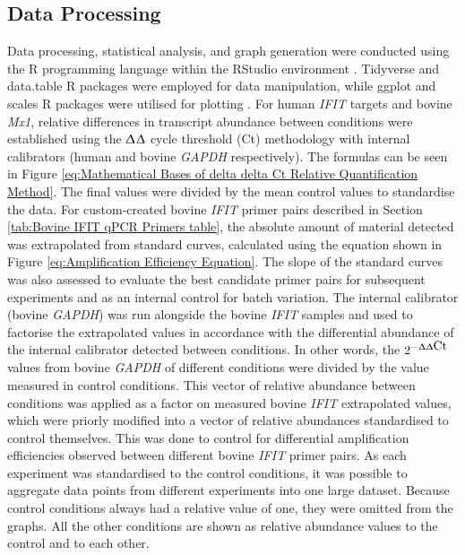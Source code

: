 \subsection{Data Processing} \label{subsec:Data Processing}
Data processing, statistical analysis, and graph generation were conducted using the R programming language \cite{RCoreTeam2022R:Computing} within the RStudio environment \cite{RStudioTeam2022RStudio:RStudio}. Tidyverse and data.table R packages \cite{Wickham2019WelcomeTidyverse, Dowle2022Data.table:data.frame} were employed for data manipulation, while ggplot and scales R packages were utilised for plotting \cite{Wickham2019WelcomeTidyverse, Wickham2022Scales:Visualization}. For human \textit{IFIT} targets and bovine \textit{Mx1}, relative differences in transcript abundance between conditions were established using the $\Updelta$$\Updelta$ cycle threshold (Ct) methodology with internal calibrators (human and bovine \textit{GAPDH} respectively). The formulas can be seen in Figure \ref{eq:Mathematical Bases of delta delta Ct Relative Quantification Method}. The final values were divided by the mean control values to standardise the data. For custom-created bovine \textit{IFIT} primer pairs described in Section \ref{tab:Bovine IFIT qPCR Primers table}, the absolute amount of material detected was extrapolated from standard curves, calculated using the equation shown in Figure \ref{eq:Amplification Efficiency Equation}. The slope of the standard curves was also assessed to evaluate the best candidate primer pairs for subsequent experiments and as an internal control for batch variation. The internal calibrator (bovine \textit{GAPDH}) was run alongside the bovine \textit{IFIT} samples and used to factorise the extrapolated values in accordance with the differential abundance of the internal calibrator detected between conditions. In other words, the \(2^{-\Updelta\Updelta \mbox{Ct}}\) values from bovine \textit{GAPDH} of different conditions were divided by the value measured in control conditions. This vector of relative abundance between conditions was applied as a factor on measured bovine \textit{IFIT} extrapolated values, which were priorly modified into a vector of relative abundances standardised to control themselves. This was done to control for differential amplification efficiencies observed between different bovine \textit{IFIT} primer pairs. As each experiment was standardised to the control conditions, it was possible to aggregate data points from different experiments into one large dataset. Because control conditions always had a relative value of one, they were omitted from the graphs. All the other conditions are shown as relative abundance values to the control and to each other.

